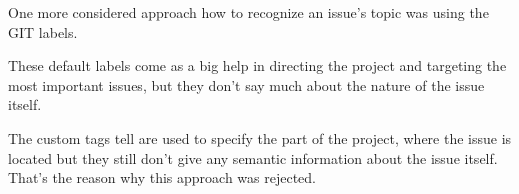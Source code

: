One more considered approach how to recognize an issue's topic was using the GIT labels. 

These default labels come as a big help in directing the project and targeting the most important issues, but they don't say much about the nature of the issue itself.

The custom tags tell are used to specify the part of the project, where the issue is located but they still don't give any semantic information about the issue itself. That's the reason why this approach was rejected. 
